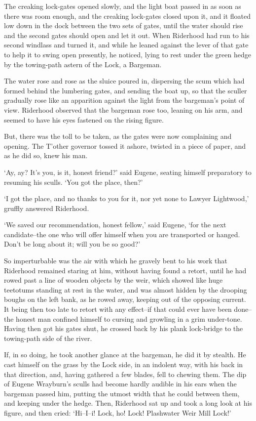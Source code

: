 The creaking lock-gates opened slowly, and the light boat passed in as
soon as there was room enough, and the creaking lock-gates closed upon
it, and it floated low down in the dock between the two sets of gates,
until the water should rise and the second gates should open and let it
out. When Riderhood had run to his second windlass and turned it, and
while he leaned against the lever of that gate to help it to swing
open presently, he noticed, lying to rest under the green hedge by the
towing-path astern of the Lock, a Bargeman.

The water rose and rose as the sluice poured in, dispersing the scum
which had formed behind the lumbering gates, and sending the boat up,
so that the sculler gradually rose like an apparition against the light
from the bargeman’s point of view. Riderhood observed that the bargeman
rose too, leaning on his arm, and seemed to have his eyes fastened on
the rising figure.

But, there was the toll to be taken, as the gates were now complaining
and opening. The T’other governor tossed it ashore, twisted in a piece
of paper, and as he did so, knew his man.

‘Ay, ay? It’s you, is it, honest friend?’ said Eugene, seating himself
preparatory to resuming his sculls. ‘You got the place, then?’

‘I got the place, and no thanks to you for it, nor yet none to Lawyer
Lightwood,’ gruffly answered Riderhood.

‘We saved our recommendation, honest fellow,’ said Eugene, ‘for the next
candidate--the one who will offer himself when you are transported or
hanged. Don’t be long about it; will you be so good?’

So imperturbable was the air with which he gravely bent to his work that
Riderhood remained staring at him, without having found a retort, until
he had rowed past a line of wooden objects by the weir, which showed
like huge teetotums standing at rest in the water, and was almost hidden
by the drooping boughs on the left bank, as he rowed away, keeping
out of the opposing current. It being then too late to retort with
any effect--if that could ever have been done--the honest man confined
himself to cursing and growling in a grim under-tone. Having then
got his gates shut, he crossed back by his plank lock-bridge to the
towing-path side of the river.

If, in so doing, he took another glance at the bargeman, he did it by
stealth. He cast himself on the grass by the Lock side, in an indolent
way, with his back in that direction, and, having gathered a few blades,
fell to chewing them. The dip of Eugene Wrayburn’s sculls had become
hardly audible in his ears when the bargeman passed him, putting the
utmost width that he could between them, and keeping under the hedge.
Then, Riderhood sat up and took a long look at his figure, and then
cried: ‘Hi--I--i! Lock, ho! Lock! Plashwater Weir Mill Lock!’

